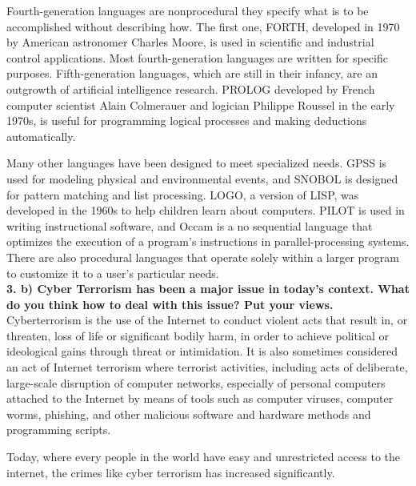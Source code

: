 \documentclass [12pt, a4paper]{article}
\begin{document}
\par
Fourth-generation languages are nonprocedural they specify what is to be accomplished without describing how. The first one, FORTH, developed in 1970 by American astronomer Charles Moore, is used in scientific and industrial control applications. Most fourth-generation languages are written for specific purposes. Fifth-generation languages, which are still in their infancy, are an outgrowth of artificial intelligence research. PROLOG developed by French computer scientist Alain Colmerauer and logician Philippe Roussel in the early 1970s, is useful for programming logical processes and making deductions automatically.\\
\par
Many other languages have been designed to meet specialized needs. GPSS is used for modeling physical and environmental events, and SNOBOL is designed for pattern matching and list processing. LOGO, a version of LISP, was developed in the 1960s to help children learn about computers. PILOT is used in writing instructional software, and Occam is a no sequential language that optimizes the execution of a program's instructions in parallel-processing systems. There are also procedural languages that operate solely within a larger program to customize it to a user's particular needs. \\

\large
\textbf{ 3. b) Cyber Terrorism has been a major issue in today's context. What do you think how to deal with this issue? Put your views.}\\
\normalsize
Cyberterrorism is the use of the Internet to conduct violent acts that result in, or threaten, loss of life or significant bodily harm, in order to achieve political or ideological gains through threat or intimidation. It is also sometimes considered an act of Internet terrorism where terrorist activities, including acts of deliberate, large-scale disruption of computer networks, especially of personal computers attached to the Internet by means of tools such as computer viruses, computer worms, phishing, and other malicious software and hardware methods and programming scripts.\\
\par
Today, where every people in the world have easy and unrestricted access to the internet, the crimes like cyber terrorism has increased significantly.
\end{document}
